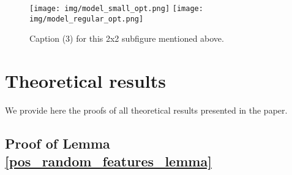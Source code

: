 \clearpage
\begin{figure}[ht]
  \texttt{[image: img/model\_small\_opt.png]}
  \texttt{[image: img/model\_regular\_opt.png]}

  \caption{Caption (3) for this 2x2 subfigure mentioned above.}
  \label{fig:appendix_runtime_2}
\end{figure}





\clearpage

\section{Theoretical results}
\label{appendix:theoretical_results}
We provide here the proofs of all theoretical results presented in the paper.

\subsection{Proof of Lemma \ref{pos_random_features_lemma}}

